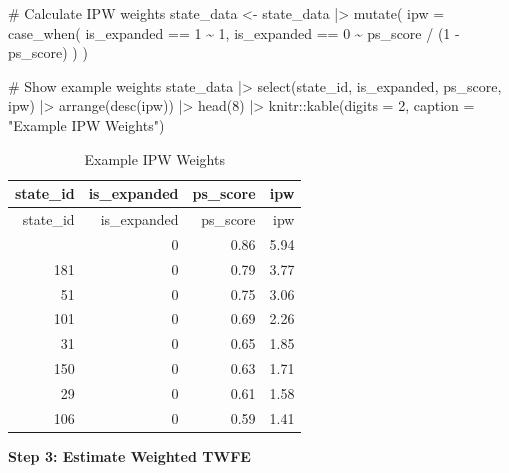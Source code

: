 \documentclass[
  letterpaper,
  DIV=11,
  numbers=noendperiod]{scrreprt}
\newenvironment{Shaded}{\begin{snugshade}}{\end{snugshade}}
\newcommand{\AttributeTok}[1]{\textcolor[rgb]{0.40,0.45,0.13}{#1}}
\newcommand{\CommentTok}[1]{\textcolor[rgb]{0.37,0.37,0.37}{#1}}
\newcommand{\DecValTok}[1]{\textcolor[rgb]{0.68,0.00,0.00}{#1}}
\newcommand{\FunctionTok}[1]{\textcolor[rgb]{0.28,0.35,0.67}{#1}}
\newcommand{\NormalTok}[1]{\textcolor[rgb]{0.00,0.23,0.31}{#1}}
\newcommand{\OtherTok}[1]{\textcolor[rgb]{0.00,0.23,0.31}{#1}}
\newcommand{\SpecialCharTok}[1]{\textcolor[rgb]{0.37,0.37,0.37}{#1}}
\newcommand{\StringTok}[1]{\textcolor[rgb]{0.13,0.47,0.30}{#1}}
\begin{document}
\begin{Shaded}
\begin{Highlighting}[]
\CommentTok{\# Calculate IPW weights}
\NormalTok{state\_data }\OtherTok{\textless{}{-}}\NormalTok{ state\_data }\SpecialCharTok{|\textgreater{}}
    \FunctionTok{mutate}\NormalTok{(}
        \AttributeTok{ipw =} \FunctionTok{case\_when}\NormalTok{(}
\NormalTok{            is\_expanded }\SpecialCharTok{==} \DecValTok{1} \SpecialCharTok{\textasciitilde{}} \DecValTok{1}\NormalTok{,}
\NormalTok{            is\_expanded }\SpecialCharTok{==} \DecValTok{0} \SpecialCharTok{\textasciitilde{}}\NormalTok{ ps\_score }\SpecialCharTok{/}\NormalTok{ (}\DecValTok{1} \SpecialCharTok{{-}}\NormalTok{ ps\_score)}
\NormalTok{        )}
\NormalTok{    )}

\CommentTok{\# Show example weights}
\NormalTok{state\_data }\SpecialCharTok{|\textgreater{}}
    \FunctionTok{select}\NormalTok{(state\_id, is\_expanded, ps\_score, ipw) }\SpecialCharTok{|\textgreater{}}
    \FunctionTok{arrange}\NormalTok{(}\FunctionTok{desc}\NormalTok{(ipw)) }\SpecialCharTok{|\textgreater{}}
    \FunctionTok{head}\NormalTok{(}\DecValTok{8}\NormalTok{) }\SpecialCharTok{|\textgreater{}}
\NormalTok{    knitr}\SpecialCharTok{::}\FunctionTok{kable}\NormalTok{(}\AttributeTok{digits =} \DecValTok{2}\NormalTok{, }\AttributeTok{caption =} \StringTok{"Example IPW Weights"}\NormalTok{)}
\end{Highlighting}
\end{Shaded}

\begin{longtable}[]{@{}rrrr@{}}
\caption{Example IPW Weights}\tabularnewline
\toprule\noalign{}
state\_id & is\_expanded & ps\_score & ipw \\
\midrule\noalign{}
\endfirsthead
\toprule\noalign{}
state\_id & is\_expanded & ps\_score & ipw \\
\midrule\noalign{}
\endhead
\bottomrule\noalign{}
\endlastfoot
32 & 0 & 0.86 & 5.94 \\
181 & 0 & 0.79 & 3.77 \\
51 & 0 & 0.75 & 3.06 \\
101 & 0 & 0.69 & 2.26 \\
31 & 0 & 0.65 & 1.85 \\
150 & 0 & 0.63 & 1.71 \\
29 & 0 & 0.61 & 1.58 \\
106 & 0 & 0.59 & 1.41 \\
\end{longtable}

\textbf{Step 3: Estimate Weighted TWFE}
\end{document}
